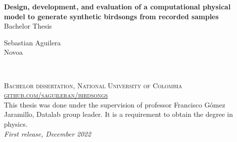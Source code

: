 



\begingroup
\thispagestyle{empty}
\centering
\vspace{0.4cm}\hspace{-3in}
\par\normalfont\fontsize{30}{30}\sffamily\selectfont
\textbf{Design, development, and
evaluation of a computational physical
model to generate synthetic birdsongs from recorded samples}\\
\centering
{\LARGE Bachelor Thesis}\par %
\vspace*{1cm}
{\Huge Sebastian Aguilera\\Novoa}\par %
\endgroup



\newpage
~\vfill
\thispagestyle{empty}


\noindent \textsc{Bachelor dissertation, National University of Colombia}\\

\noindent \href{https://github.com/saguileran/birdsongs}{\textsc{github.com/saguileran/birdsongs}}\\ %

\noindent This thesis was done under the supervision of professor Francisco Gómez Jaramillo, Datalab group leader. It is a requirement to obtain the degree in physics. \\ %

\noindent \textit{First release, December 2022} %





